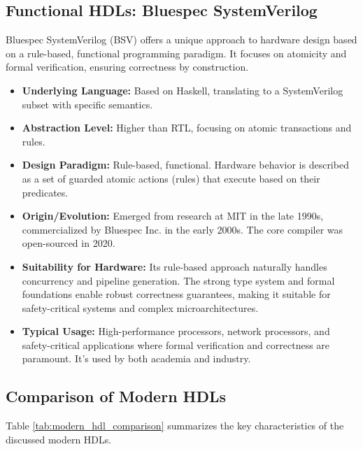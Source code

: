 \documentclass[sigconf, anonymous=false]{acmart} %
\begin{document}
\subsection{Functional HDLs: Bluespec SystemVerilog}
Bluespec SystemVerilog (BSV) offers a unique approach to hardware design based on a rule-based, functional programming paradigm. It focuses on atomicity and formal verification, ensuring correctness by construction.
\begin{itemize}
    \item \textbf{Underlying Language:} Based on Haskell, translating to a SystemVerilog subset with specific semantics.
    \item \textbf{Abstraction Level:} Higher than RTL, focusing on atomic transactions and rules.
    \item \textbf{Design Paradigm:} Rule-based, functional. Hardware behavior is described as a set of guarded atomic actions (rules) that execute based on their predicates.
    \item \textbf{Origin/Evolution:} Emerged from research at MIT in the late 1990s, commercialized by Bluespec Inc. in the early 2000s. The core compiler was open-sourced in 2020.
    \item \textbf{Suitability for Hardware:} Its rule-based approach naturally handles concurrency and pipeline generation. The strong type system and formal foundations enable robust correctness guarantees, making it suitable for safety-critical systems and complex microarchitectures.
    \item \textbf{Typical Usage:} High-performance processors, network processors, and safety-critical applications where formal verification and correctness are paramount. It's used by both academia and industry.
\end{itemize}

\subsection{Comparison of Modern HDLs}
Table \ref{tab:modern_hdl_comparison} summarizes the key characteristics of the discussed modern HDLs.
\end{document}
